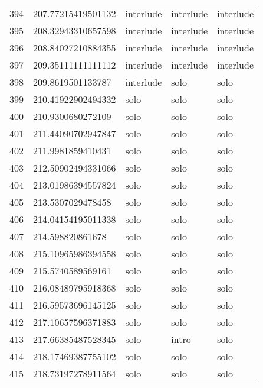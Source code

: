 \begin{table}[]
\begin{tabular}{lllll}
    394  & 207.77215419501132 & interlude    & interlude       & interlude      \\
    395  & 208.32943310657598 & interlude    & interlude       & interlude      \\
    396  & 208.84027210884355 & interlude    & interlude       & interlude      \\
    397  & 209.35111111111112 & interlude    & interlude       & interlude      \\
    398  & 209.8619501133787  & interlude    & solo            & solo           \\
    399  & 210.41922902494332 & solo         & solo            & solo           \\
    400  & 210.9300680272109  & solo         & solo            & solo           \\
    401  & 211.44090702947847 & solo         & solo            & solo           \\
    402  & 211.9981859410431  & solo         & solo            & solo           \\
    403  & 212.50902494331066 & solo         & solo            & solo           \\
    404  & 213.01986394557824 & solo         & solo            & solo           \\
    405  & 213.5307029478458  & solo         & solo            & solo           \\
    406  & 214.04154195011338 & solo         & solo            & solo           \\
    407  & 214.598820861678   & solo         & solo            & solo           \\
    408  & 215.10965986394558 & solo         & solo            & solo           \\
    409  & 215.5740589569161  & solo         & solo            & solo           \\
    410  & 216.08489795918368 & solo         & solo            & solo           \\
    411  & 216.59573696145125 & solo         & solo            & solo           \\
    412  & 217.10657596371883 & solo         & solo            & solo           \\
    413  & 217.66385487528345 & solo         & intro           & solo           \\
    414  & 218.17469387755102 & solo         & solo            & solo           \\
    415  & 218.73197278911564 & solo         & solo            & solo           \\

\end{tabular}
\end{table}
